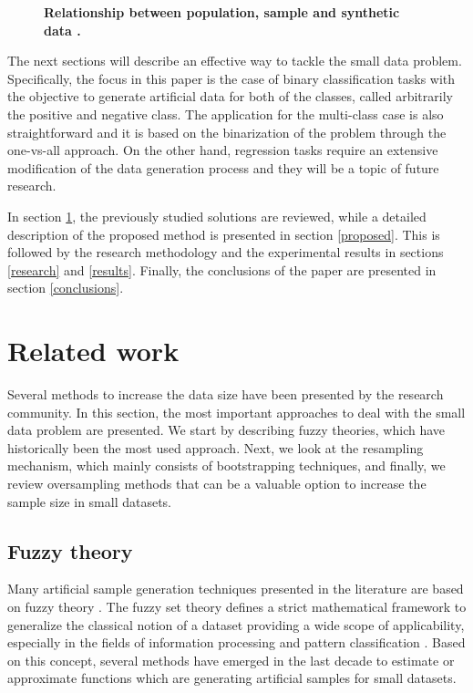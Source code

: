 \documentclass[10pt,letterpaper]{article}
\begin{document}
\begin{figure}[!h]
	\centering
	\caption{\bf Relationship between population, sample and synthetic data \cite{Li.2006}.}
	\label{fig:relationship}
\end{figure}

The next sections will describe an effective way to tackle the small data
problem. Specifically, the focus in this paper is the case of binary classification tasks with the objective to generate artificial data for both of the classes, called arbitrarily the positive and negative class. The application for the multi-class case is also straightforward and it is based on the binarization of the problem through the one-vs-all approach. On the other hand, regression tasks require an extensive modification of the data generation process and they will be a topic of future research.

In section \ref{related}, the previously studied solutions are reviewed, while a detailed description of the proposed method is presented in section \ref{proposed}. This is followed by the research methodology and the experimental results in sections \ref{research} and \ref{results}. Finally, the conclusions of the paper are presented in section \ref{conclusions}.

\section{Related work}
\label{related}

Several methods to increase the data size have been presented by the research community. In this section, the most important approaches to deal with the small data problem are presented. We start by describing fuzzy theories, which have historically been the most used approach. Next, we look at the resampling mechanism, which mainly consists of bootstrapping techniques, and finally, we review oversampling methods that can be a valuable option to increase the sample size in small datasets.

\subsection{Fuzzy theory}

Many artificial sample generation techniques presented in the literature are based on fuzzy theory \cite{AbdulLateh.2017}. The fuzzy set theory defines a strict mathematical framework to generalize the classical notion of a dataset providing a wide scope of applicability, especially in the fields of information processing and pattern classification \cite{Zimmermann.2010}. Based on this concept, several methods have emerged in the last decade to estimate or approximate functions which are generating artificial samples for small datasets.
\end{document}
